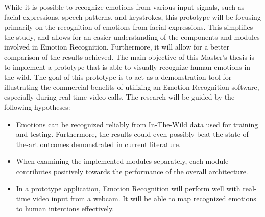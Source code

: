 While it is possible to recognize emotions from various input signals, such as facial expressions, speech patterns, and keystrokes, this prototype will be focusing primarily on the recognition of emotions from facial expressions. This simplifies the study, and allows for an easier understanding of the components and modules involved in Emotion Recognition. Furthermore, it will allow for a better comparison of the results achieved. 
\newline\newline
The main objective of this Master's thesis is to implement a prototype that is able to visually recognize human emotions in-the-wild. The goal of this prototype is to act as a demonstration tool for illustrating the commercial benefits of utilizing an Emotion Recognition software, especially during real-time video calls. 
\newline\newline
The research will be guided by the following hypotheses: 
\begin{itemize}
    \item Emotions can be recognized reliably from In-The-Wild data used for training and testing. Furthermore, the results could even possibly beat the state-of-the-art outcomes demonstrated in current literature.
    \item When examining the implemented modules separately, each module contributes positively towards the performance of the overall architecture.
    \item In a prototype application, Emotion Recognition will perform well with real-time video input from a webcam. It will be able to map recognized emotions to human intentions effectively.

\end{itemize}

